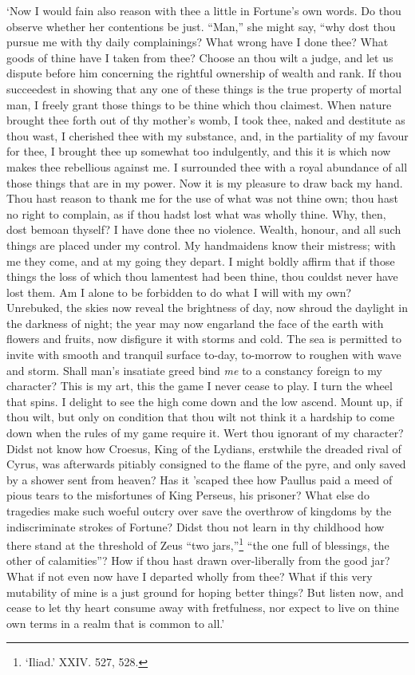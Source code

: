 \documentclass[12pt]{book}
\begin{document}
`Now I would fain also reason with thee a little in Fortune's own words.
Do thou observe whether her contentions be just. ``Man,'' she might say,
``why dost thou pursue me with thy daily complainings? What wrong have I
done thee? What goods of thine have I taken from thee? Choose an thou
wilt a judge, and let us dispute before him concerning the rightful
ownership of wealth and rank. If thou succeedest in showing that any one
of these things is the true property of mortal man, I freely grant those
things to be thine which thou claimest. When nature brought thee forth
out of thy mother's womb, I took thee, naked and destitute as thou wast,
I cherished thee with my substance, and, in the partiality of my favour
for thee, I brought thee up somewhat too indulgently, and this it is
which now makes thee rebellious against me. I surrounded thee with a
royal abundance of all those things that are in my power. Now it is my
pleasure to draw back my hand. Thou hast reason to thank me for the use
of what was not thine own; thou hast no right to complain, as if thou
hadst lost what was wholly thine. Why, then, dost bemoan thyself? I have
done thee no violence. Wealth, honour, and all such things are placed
under my control. My handmaidens know their mistress; with me they come,
and at my going they depart. I might boldly affirm that if those things
the loss of which thou lamentest had been thine, thou couldst never have
lost them. Am I alone to be forbidden to do what I will with my own?
Unrebuked, the skies now reveal the brightness of day, now shroud the
daylight in the darkness of night; the year may now engarland the face
of the earth with flowers and fruits, now disfigure it with storms and
cold. The sea is permitted to invite with smooth and tranquil surface
to-day, to-morrow to roughen with wave and storm. Shall man's insatiate
greed bind \emph{me} to a constancy foreign to my character? This is my art,
this the game I never cease to play. I turn the wheel that spins. I
delight to see the high come down and the low ascend. Mount up, if thou
wilt, but only on condition that thou wilt not think it a hardship to
come down when the rules of my game require it. Wert thou ignorant of my
character? Didst not know how Croesus, King of the Lydians, erstwhile
the dreaded rival of Cyrus, was afterwards pitiably consigned to the
flame of the pyre, and only saved by a shower sent from heaven? Has it
'scaped thee how Paullus paid a meed of pious tears to the misfortunes
of King Perseus, his prisoner? What else do tragedies make such woeful
outcry over save the overthrow of kingdoms by the indiscriminate strokes
of Fortune? Didst thou not learn in thy childhood how there stand at the
threshold of Zeus ``two jars,''\footnote{‘Iliad.’ XXIV. 527, 528.}
``the one full of blessings, the other of
calamities''? How if thou hast drawn over-liberally from the good jar?
What if not even now have I departed wholly from thee? What if this very
mutability of mine is a just ground for hoping better things? But listen
now, and cease to let thy heart consume away with fretfulness, nor
expect to live on thine own terms in a realm that is common to all.'
\end{document}
